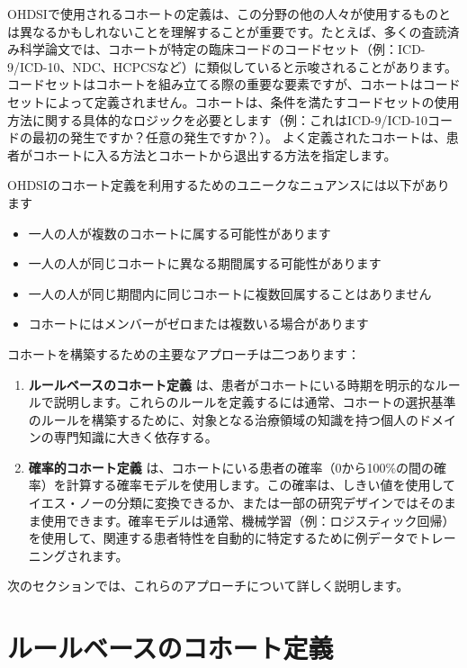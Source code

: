 \documentclass[
  11pt]{book}
\providecommand{\tightlist}{%
  \setlength{\itemsep}{0pt}\setlength{\parskip}{0pt}}
\theoremstyle{definition}
\theoremstyle{definition}
\theoremstyle{definition}
\theoremstyle{definition}
\theoremstyle{remark}
\begin{document}
  OHDSIで使用されるコホートの定義は、この分野の他の人々が使用するものとは異なるかもしれないことを理解することが重要です。たとえば、多くの査読済み科学論文では、コホートが特定の臨床コードのコードセット（例：ICD-9/ICD-10、NDC、HCPCSなど）に類似していると示唆されることがあります。コードセットはコホートを組み立てる際の重要な要素ですが、コホートはコードセットによって定義されません。コホートは、条件を満たすコードセットの使用方法に関する具体的なロジックを必要とします（例：これはICD-9/ICD-10コードの最初の発生ですか？任意の発生ですか？）。 よく定義されたコホートは、患者がコホートに入る方法とコホートから退出する方法を指定します。 

 OHDSIのコホート定義を利用するためのユニークなニュアンスには以下があります

\begin{itemize}
\tightlist
\item
  一人の人が複数のコホートに属する可能性があります
\item
  一人の人が同じコホートに異なる期間属する可能性があります
\item
  一人の人が同じ期間内に同じコホートに複数回属することはありません
\item
  コホートにはメンバーがゼロまたは複数いる場合があります
\end{itemize}

コホートを構築するための主要なアプローチは二つあります：

\begin{enumerate}
\def\labelenumi{\arabic{enumi}.}
\item
  \textbf{ルールベースのコホート定義} は、患者がコホートにいる時期を明示的なルールで説明します。これらのルールを定義するには通常、コホートの選択基準のルールを構築するために、対象となる治療領域の知識を持つ個人のドメインの専門知識に大きく依存する。
\item
  \textbf{確率的コホート定義} は、コホートにいる患者の確率（0から100\%の間の確率）を計算する確率モデルを使用します。この確率は、しきい値を使用してイエス・ノーの分類に変換できるか、または一部の研究デザインではそのまま使用できます。確率モデルは通常、機械学習（例：ロジスティック回帰）を使用して、関連する患者特性を自動的に特定するために例データでトレーニングされます。
\end{enumerate}

次のセクションでは、これらのアプローチについて詳しく説明します。

\section{ルールベースのコホート定義}\label{ux30ebux30fcux30ebux30d9ux30fcux30b9ux306eux30b3ux30dbux30fcux30c8ux5b9aux7fa9}
\end{document}
